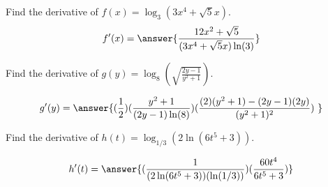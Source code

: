\documentclass{ximera}
\author{Bobby Ramsey}
\begin{document}
\begin{exercise}
	Find the derivative of $\displaystyle f(x) = \log_{3}(3x^4+\sqrt{5}x)$.
	\[ f'(x) = \answer{ \frac{12x^2+\sqrt{5}}{(3x^4+\sqrt{5}x)\ln(3)} }\]
\end{exercise}

\begin{exercise}
	Find the derivative of $\displaystyle g(y) = \log_8\left( \sqrt{\frac{2y-1}{y^2+1}} \right)$.

	\[ g'(y) = \answer{ (\frac{1}{2}) (\frac{y^2+1}{(2y-1)\ln(8)}) (\frac{(2)(y^2+1)-(2y-1)(2y)}{(y^2+1)^2})\  }\]
\end{exercise}

\begin{exercise}
	Find the derivative of $\displaystyle h(t) = \log_{1/3}\left( 2\ln\left( 6t^5 + 3\right)\right)$.
	
	\[ h'(t) = \answer{   (\frac{1}{(2\ln( 6t^5 + 3))(\ln(1/3))}) (\frac{60t^4}{6t^5+3})  }\]
\end{exercise}
\end{document}
